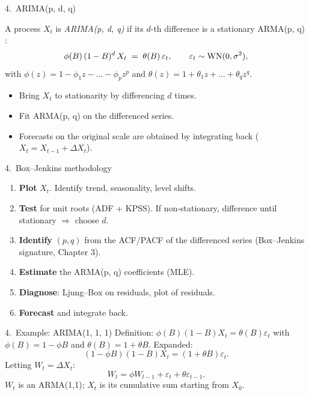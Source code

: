 \documentclass[aspectratio=169]{beamer}
\begin{document}
\begin{frame}{4.~ARIMA(p, d, q)}
  \begin{defbox}[ARIMA(p, d, q)]
    A process $X_t$ is \emph{ARIMA(p, d, q)} if its $d$-th difference
    is a stationary ARMA(p, q) :
    \[
      \phi(B)\, (1 - B)^d\, X_t \;=\; \theta(B)\, \varepsilon_t,
      \qquad \varepsilon_t \sim \mathrm{WN}(0, \sigma^2),
    \]
    with $\phi(z) = 1 - \phi_1 z - \dots - \phi_p z^p$ and
    $\theta(z) = 1 + \theta_1 z + \dots + \theta_q z^q$.
  \end{defbox}
  \medskip
  \begin{itemize}
    \item Bring $X_t$ to stationarity by differencing $d$ times.
    \item Fit ARMA(p, q) on the differenced series.
    \item Forecasts on the original scale are obtained by integrating
          back ($X_t = X_{t-1} + \Delta X_t$).
  \end{itemize}
\end{frame}

\begin{frame}{4.~Box--Jenkins methodology}
  \begin{enumerate}
    \item \textbf{Plot} $X_t$. Identify trend, seasonality, level shifts.
    \item \textbf{Test} for unit roots (ADF + KPSS). If non-stationary,
          difference until stationary $\Rightarrow$ choose $d$.
    \item \textbf{Identify} $(p, q)$ from the ACF/PACF of the
          differenced series (Box--Jenkins signature, Chapter 3).
    \item \textbf{Estimate} the ARMA(p, q) coefficients (MLE).
    \item \textbf{Diagnose}: Ljung--Box on residuals, plot of residuals.
    \item \textbf{Forecast} and integrate back.
  \end{enumerate}
\end{frame}

\begin{frame}{4.~Example: ARIMA(1, 1, 1)}
  Definition: $\phi(B)(1 - B) X_t = \theta(B) \varepsilon_t$ with
  $\phi(B) = 1 - \phi B$ and $\theta(B) = 1 + \theta B$.
  \medskip
  Expanded:
  \[
    (1 - \phi B)(1 - B) X_t = (1 + \theta B) \varepsilon_t.
  \]
  Letting $W_t = \Delta X_t$:
  \[
    W_t = \phi W_{t-1} + \varepsilon_t + \theta \varepsilon_{t-1}.
  \]
  $W_t$ is an ARMA(1,1); $X_t$ is its cumulative sum starting from
  $X_0$.
\end{frame}
\end{document}

